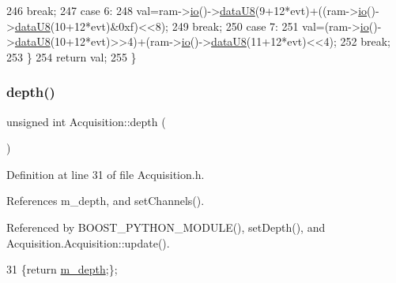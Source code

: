 \begin{DoxyCode}
246     \textcolor{keywordflow}{break};
247   \textcolor{keywordflow}{case} 6:
248     val=ram->\hyperlink{classIOobject_af04fb94137c3d86849f478ac5afab5d1}{io}()->\hyperlink{classIOdata_a75e9c318dbac3a39402179070943d4bc}{dataU8}(9+12*evt)+((ram->\hyperlink{classIOobject_af04fb94137c3d86849f478ac5afab5d1}{io}()->\hyperlink{classIOdata_a75e9c318dbac3a39402179070943d4bc}{dataU8}(10+12*evt)&0xf)<<8); 
249     \textcolor{keywordflow}{break};
250   \textcolor{keywordflow}{case} 7:
251     val=(ram->\hyperlink{classIOobject_af04fb94137c3d86849f478ac5afab5d1}{io}()->\hyperlink{classIOdata_a75e9c318dbac3a39402179070943d4bc}{dataU8}(10+12*evt)>>4)+(ram->\hyperlink{classIOobject_af04fb94137c3d86849f478ac5afab5d1}{io}()->\hyperlink{classIOdata_a75e9c318dbac3a39402179070943d4bc}{dataU8}(11+12*evt)<<4);
252     \textcolor{keywordflow}{break};
253   \}
254   \textcolor{keywordflow}{return} val;
255 \}
\end{DoxyCode}
\mbox{\label{classAcquisition_a1ad973e21a067c0de0b6264d0eb5182b}} 
\subsubsection{\texorpdfstring{depth()}{depth()}}
{\footnotesize\ttfamily unsigned int Acquisition\+::depth (\begin{DoxyParamCaption}{ }\end{DoxyParamCaption})\hspace{0.3cm}{\ttfamily [inline]}}



Definition at line 31 of file Acquisition.\+h.



References m\+\_\+depth, and set\+Channels().



Referenced by B\+O\+O\+S\+T\+\_\+\+P\+Y\+T\+H\+O\+N\+\_\+\+M\+O\+D\+U\+L\+E(), set\+Depth(), and Acquisition.\+Acquisition\+::update().


\begin{DoxyCode}
31 \{\textcolor{keywordflow}{return} \hyperlink{classAcquisition_a26628424533a2dd74d24712a14637a72}{m\_depth};\};
\end{DoxyCode}
\mbox{\label{classObject_a2e3947f2870094c332d7454117f3ec63}} 
